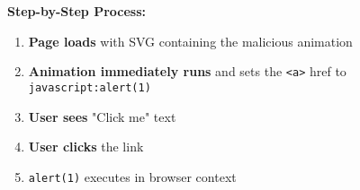 \documentclass{article}
\begin{document}
\begin{itemize}
\textbf{Step-by-Step Process:}
\begin{enumerate}
    \item \textbf{Page loads} with SVG containing the malicious animation
    \item \textbf{Animation immediately runs} and sets the \texttt{<a>} href to \texttt{javascript:alert(1)}
    \item \textbf{User sees} "Click me" text
    \item \textbf{User clicks} the link
    \item \texttt{alert(1)} executes in browser context
\end{enumerate}




\end{itemize}
\end{document}
